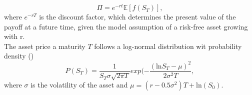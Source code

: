 \begin{equation}
    \Pi = e^{-rt} \mathbb{E}[f(S_T)],
\end{equation}
where $e^{-rT}$ is the discount factor, which determines the present value of the payoff at a future time, given the model assumption of a risk-free asset growing with r.\\
The asset price a maturity $T$ follows a log-normal distribution wit probability density (\cite{1905.02666})
\begin{equation}
    P(S_T) = \frac{1}{S_T \sigma \sqrt{2 \pi T}} exp (- \frac{(\text{ln} S_T - \mu)^2}{2 \sigma^2 T}, \label{eq:lognormal}
\end{equation}
where $\sigma$ is the volatility of the asset and $\mu = (r-0.5\sigma^2)T + \text{ln}(S_0)$.
